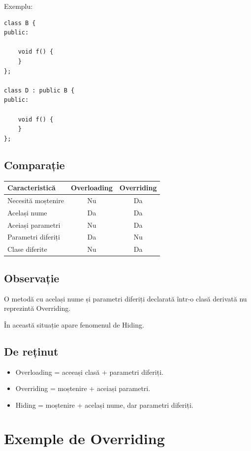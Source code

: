 \documentclass[12pt,a4paper]{article}
\begin{document}
Exemplu:

\begin{verbatim}
class B {
public:

    void f() {
    }
};

class D : public B {
public:

    void f() {
    }
};
\end{verbatim}

\subsection{Comparație}

\begin{center}
\begin{tabular}{|l|c|c|}
\hline
Caracteristică & Overloading & Overriding \\
\hline
Necesită moștenire & Nu & Da \\
\hline
Același nume & Da & Da \\
\hline
Aceiași parametri & Nu & Da \\
\hline
Parametri diferiți & Da & Nu \\
\hline
Clase diferite & Nu & Da \\
\hline
\end{tabular}
\end{center}

\subsection{Observație}

O metodă cu același nume și parametri diferiți declarată într-o clasă derivată nu reprezintă Overriding.

În această situație apare fenomenul de Hiding.

\subsection{De reținut}

\begin{itemize}
\item Overloading = aceeași clasă + parametri diferiți.
\item Overriding = moștenire + aceiași parametri.
\item Hiding = moștenire + același nume, dar parametri diferiți.
\end{itemize}




\section{Exemple de Overriding}
\end{document}
